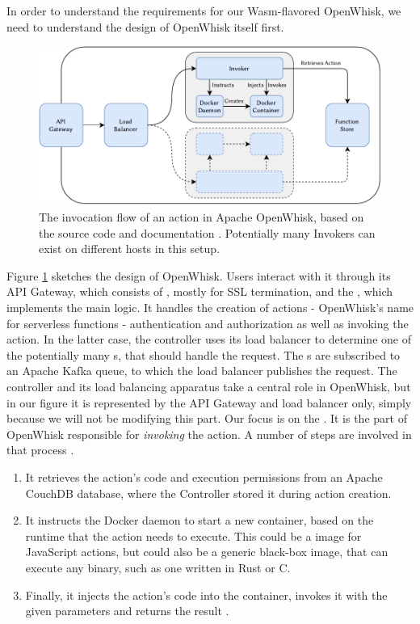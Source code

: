 In order to understand the requirements for our Wasm-flavored OpenWhisk, we need to understand the design of OpenWhisk itself first.

\begin{figure}
    \includegraphics{figures/OpenWhiskActionInvocationFlow.pdf}
    \caption{The invocation flow of an action in Apache OpenWhisk, based on the source code and documentation \cite{OpenWhiskSystemDesign}. Potentially many Invokers can exist on different hosts in this setup.}
    \label{fig:openwhisk-action-invocation-flow}
\end{figure}

Figure \ref{fig:openwhisk-action-invocation-flow} sketches the design of OpenWhisk. Users interact with it through its API Gateway, which consists of , mostly for SSL termination, and the , which implements the main logic. It handles the creation of actions - OpenWhisk's name for serverless functions - authentication and authorization as well as invoking the action.
In the latter case, the controller uses its load balancer to determine one of the potentially many s, that should handle the request. The s are subscribed to an Apache Kafka queue, to which the load balancer publishes the request. The controller and its load balancing apparatus take a central role in OpenWhisk, but in our figure it is represented by the API Gateway and load balancer only, simply because we will not be modifying this part.
Our focus is on the . It is the part of OpenWhisk responsible for \emph{invoking} the action. A number of steps are involved in that process \cite{OpenWhiskSystemDesign}.

\begin{enumerate}
    \item It retrieves the action's code and execution permissions from an Apache CouchDB database, where the Controller stored it during action creation.
    \item It instructs the Docker daemon to start a new container, based on the runtime that the action needs to execute. This could be a  image for JavaScript actions, but could also be a generic  black-box image, that can execute any binary, such as one written in Rust or C.
    \item Finally, it injects the action's code into the container, invokes it with the given parameters and returns the result \cite{OpenWhiskSystemDesign}.
\end{enumerate}

